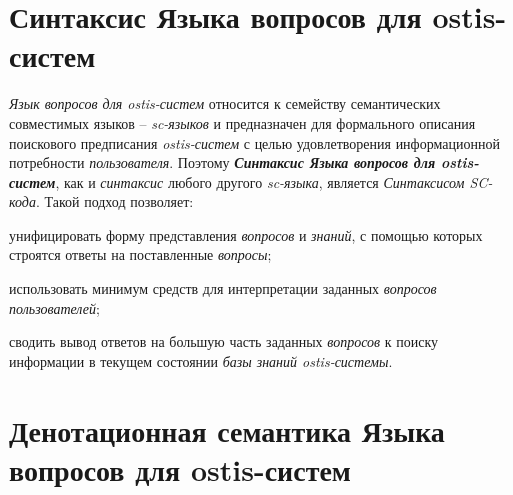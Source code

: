 \begin{SCn}
\begin{scnindent}
\end{scnindent}
\begin{scnindent}
\end{scnindent}
\begin{scnindent}
\end{scnindent}
\end{SCn}

\section{Синтаксис Языка вопросов для ostis-систем}
\label{sec_requests_syntax}

\textit{Язык вопросов для ostis-систем} относится к семейству семантических совместимых языков – \textit{sc-языков} и предназначен для формального описания поискового предписания \textit{ostis-систем} с целью удовлетворения информационной потребности \textit{пользователя}. Поэтому \textbf{\textit{Синтаксис Языка вопросов для ostis-систем}}, как и \textit{синтаксис} любого другого \textit{sc-языка}, является \textit{Синтаксисом SC-кода}. Такой подход позволяет:
\begin{textitemize}
	\item унифицировать форму представления \textit{вопросов} и \textit{знаний}, с помощью которых строятся ответы на поставленные \textit{вопросы};
	\item использовать минимум средств для интерпретации заданных \textit{вопросов пользователей};
	\item сводить вывод ответов на большую часть заданных \textit{вопросов} к поиску информации в текущем состоянии \textit{базы знаний ostis-системы}.
\end{textitemize}

\section{Денотационная семантика Языка вопросов для ostis-систем}
\label{sec_requests_den_semantics}

